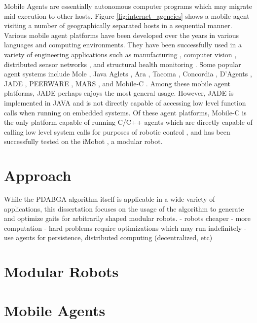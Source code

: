    Mobile Agents are essentially autonomous computer programs which may
    migrate mid-execution to other hosts. 
    Figure \ref{fig:internet_agencies} shows a mobile agent visiting a number
      of geographically separated hosts in a sequential manner. 
    Various mobile agent platforms have been developed over the years in
    various languages and computing environments. 
    They have been successfully used in a variety of engineering applications
    such as manufacturing \cite{DiStefano2008, Nestinger2010}, computer vision
    \cite{Nestinger2010b}, distributed sensor networks \cite{Fok2005, Wu2001},
      and structural health monitoring \cite{Taylor2009}. Some popular agent
      systems include Mole \cite{Baumann2002}, Java Aglets \cite{Lange1998},
      Ara \cite{Peine2002}, Tacoma \cite{Johnansen2002}, Concordia
      \cite{Wong1997}, D’Agents \cite{Gray2002}, JADE \cite{Bellifemine2008},
      PEERWARE \cite{Cugola2001}, MARS \cite{Cabri2000}, and
      Mobile-C \cite{Chen2006, Chou2010, mobilec}. 
    Among these mobile agent platforms, JADE perhaps enjoys the most general
      usage. 
    However, JADE is implemented in JAVA and is not directly capable of
      accessing low level function calls when running on embedded systems. 
    Of these agent platforms, Mobile-C is the only platform capable of running
    C/C++ agents which are directly capable of calling low level system calls
      for purposes of robotic control \cite{Nestinger2010}, and has been
      successfully tested on the iMobot \cite{Ryland2010, Ko2010}, a modular
      robot.


  \section{Approach} %
    While the PDABGA algorithm itself is applicable in a wide variety of 
      applications, this dissertation focuses on the usage of the algorithm to 
      generate and optimize gaits for arbitrarily shaped modular robots. 
    - robots cheaper
    - more computation
    - hard problems require optimizations which may run indefinitely
    - use agents for persistence, distributed computing (decentralized, etc)

  \section{Modular Robots}

  \section{Mobile Agents}

